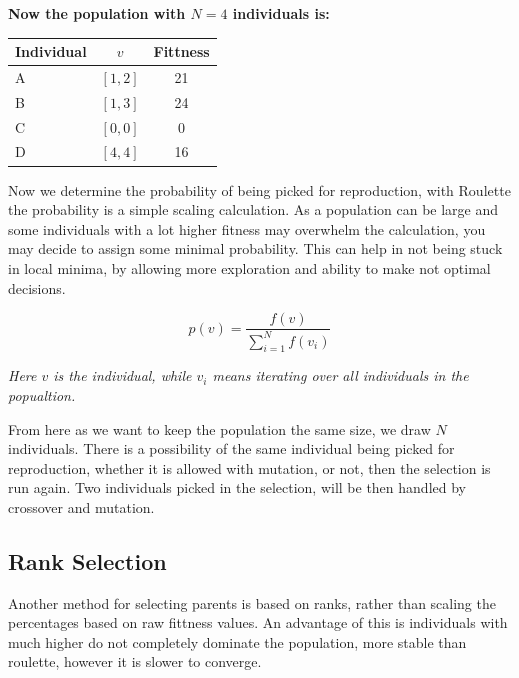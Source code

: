 \documentclass[11pt]{article}
\begin{document}
    \textbf{Now the population with $N=4$ individuals is:}

    \begin{table}[h!]
        \centering
        \begin{tabular}{|l|c|c|}
            \hline
            \textbf{Individual} & \textbf{$v$} & \textbf{Fittness} \\
            \hline
            A                   & $[1, 2]$     & 21                \\
            B                   & $[1, 3]$     & 24                \\
            C                   & $[0, 0]$     & 0                 \\
            D                   & $[4, 4]$     & 16                \\
            \hline
        \end{tabular}
        \label{tab:roulette-table}
    \end{table}

    Now we determine the probability of being picked for reproduction, with Roulette the probability is a simple scaling calculation.
    As a population can be large and some individuals with a lot higher fitness may overwhelm the calculation, you may decide to assign some minimal probability.
    This can help in not being stuck in local minima, by allowing more exploration and ability to make not optimal decisions.

    \begin{equation}
        p(v) = \frac{f(v)}{\sum^N_{i=1} f(v_i)}
        \label{eq:roulette-p}
    \end{equation}

    \textit{Here $v$ is the individual, while $v_i$ means iterating over all individuals in the popualtion.}

    From here as we want to keep the population the same size, we draw $N$ individuals.
    There is a possibility of the same individual being picked for reproduction, whether it is allowed with mutation, or not, then the selection is run again.
    Two individuals picked in the selection, will be then handled by crossover and mutation.

    \subsection{Rank Selection}\label{subsec:rank-selection}

    Another method for selecting parents is based on ranks, rather than scaling the percentages based on raw fittness values.
    An advantage of this is individuals with much higher do not completely dominate the population, more stable than roulette, however it is slower to converge.\\
\end{document}
